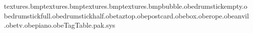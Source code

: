 textures\postcard.bmp textures\stamp.bmp textures\keeperbutton.bmp textures\rope.bmp bubble.obe drumstickempty.obe drumstickfull.obe drumstickhalf.obe taztop.obe postcard.obe box.obe rope.obe anvil.obe tv.obe piano.obe TagTable.pak.sys 